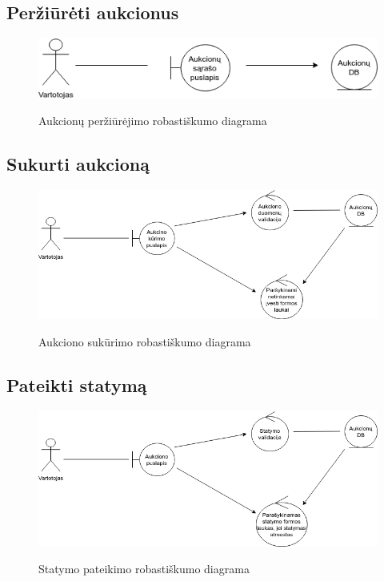 \documentclass{VUMIFPSkursinis}
\begin{document}
	\subsection{Peržiūrėti aukcionus}
		\begin{figure}[H]
		\centering
		\includegraphics[width=\linewidth]{img/aukcionai.png}
		\label{fig:aukcionai}
		\caption{Aukcionų peržiūrėjimo robastiškumo diagrama}
	\end{figure}
	\subsection{Sukurti aukcioną}
		\begin{figure}[H]
		\centering
		\includegraphics[width=\linewidth]{img/sukurti.png}
		\label{fig:sukurti}
		\caption{Aukciono sukūrimo robastiškumo diagrama}
	\end{figure}
	\subsection{Pateikti statymą}
		\begin{figure}[H]
		\centering
		\includegraphics[width=\linewidth]{img/statymas.png}
		\label{fig:statymas}
		\caption{Statymo pateikimo robastiškumo diagrama}
	\end{figure}
\end{document}
